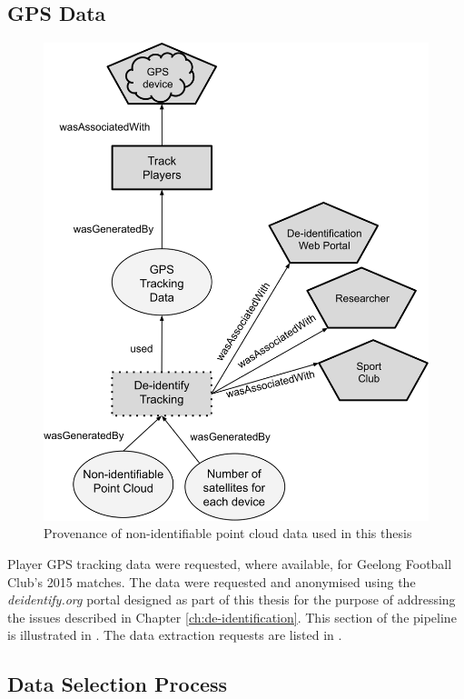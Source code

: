 
\subsection{GPS Data}
\label{sec:gps-data-selection}

\begin{figure}[H]
\centering
\includegraphics[width=0.7\linewidth]{figs/prov/prov-1-c.png}
\caption{Provenance of non-identifiable point cloud data used in this thesis \notationdetails{}
\label{fig:prov1c}}
\end{figure}

Player GPS tracking data were requested, where available, for Geelong Football Club's 2015 matches. The data were requested and anonymised using the \textit{deidentify.org} portal \cite{Simmons2018} designed as part of this thesis for the purpose of addressing the issues described in Chapter \ref{ch:de-identification}. This section of the pipeline is illustrated in . The data extraction requests are listed in .

\subsection{Data Selection Process}
\label{sec:integration-data-selection-process}

